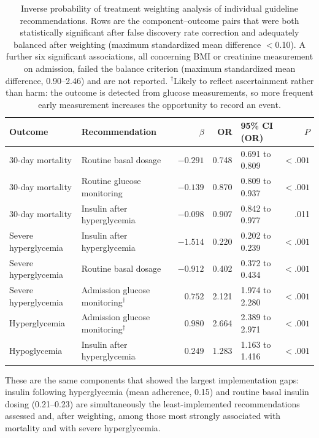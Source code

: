 \begin{table}[t]
\centering
\caption{Inverse probability of treatment weighting analysis of individual
guideline recommendations. Rows are the component--outcome pairs that were
both statistically significant after false discovery rate correction and
adequately balanced after weighting (maximum standardized mean difference
$<$0.10). A further six significant associations, all concerning BMI or
creatinine measurement on admission, failed the balance criterion (maximum
standardized mean difference, 0.90--2.46) and are not reported.
$^{\dagger}$Likely to reflect ascertainment rather than harm: the outcome is
detected from glucose measurements, so more frequent early measurement
increases the opportunity to record an event.}
\label{tab:iptw-patterns}
\small
\setlength{\tabcolsep}{4pt}
\begin{tabular}{llrrlr}
\toprule
Outcome & Recommendation & $\beta$ & OR & 95\% CI (OR) & $P$ \\
\midrule
30-day mortality & Routine basal dosage
  & $-0.291$ & 0.748 & 0.691 to 0.809 & $<.001$ \\
30-day mortality & Routine glucose monitoring
  & $-0.139$ & 0.870 & 0.809 to 0.937 & $<.001$ \\
30-day mortality & Insulin after hyperglycemia
  & $-0.098$ & 0.907 & 0.842 to 0.977 & .011 \\
\midrule
Severe hyperglycemia & Insulin after hyperglycemia
  & $-1.514$ & 0.220 & 0.202 to 0.239 & $<.001$ \\
Severe hyperglycemia & Routine basal dosage
  & $-0.912$ & 0.402 & 0.372 to 0.434 & $<.001$ \\
Severe hyperglycemia & Admission glucose monitoring$^{\dagger}$
  & $0.752$ & 2.121 & 1.974 to 2.280 & $<.001$ \\
\midrule
Hyperglycemia & Admission glucose monitoring$^{\dagger}$
  & $0.980$ & 2.664 & 2.389 to 2.971 & $<.001$ \\
\midrule
Hypoglycemia & Insulin after hyperglycemia
  & $0.249$ & 1.283 & 1.163 to 1.416 & $<.001$ \\
\bottomrule
\end{tabular}
\end{table}

These are the same components that showed the largest implementation gaps:
insulin following hyperglycemia (mean adherence, 0.15) and routine basal
insulin dosing (0.21--0.23) are simultaneously the least-implemented
recommendations assessed and, after weighting, among those most strongly
associated with mortality and with severe hyperglycemia.


